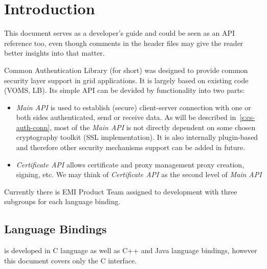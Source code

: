 %
%

\section{Introduction}

This document serves as a developer's guide and could be
seen as an API reference too, even though comments in
the header files may give the reader better insights into that matter.

Common Authentication Library (\CANL for short)
was designed to provide common security layer support in grid 
applications. It is largely based on existing code (VOMS, LB). Its 
simple API can be devided by functionality into two parts:

\begin{itemize}
\item \textit{\CANL Main API} is used to establish (secure) client-server
connection with one or both sides authenticated, send or receive data.
As will be described in~\ref{s:cs-auth-conn}, most of the \textit{Main API} 
is not directly dependent on some chosen cryptography toolkit 
(SSL implementation). It is
also internally plugin-based and therefore other security mechanisms support can
be added in future.
\item \textit{\CANL Certificate API} allows certificate and proxy management \eg
proxy creation, signing, etc. We may think of \textit{Certificate API} as the
second level of \textit{Main API}
\end{itemize}

Currently there is EMI Product Team assigned to \CANL development with three
subgroups for each language binding.

\subsection{Language Bindings}
\CANL is developed in C language as well as C++ and Java language bindings,
however this document covers only the C interface.

